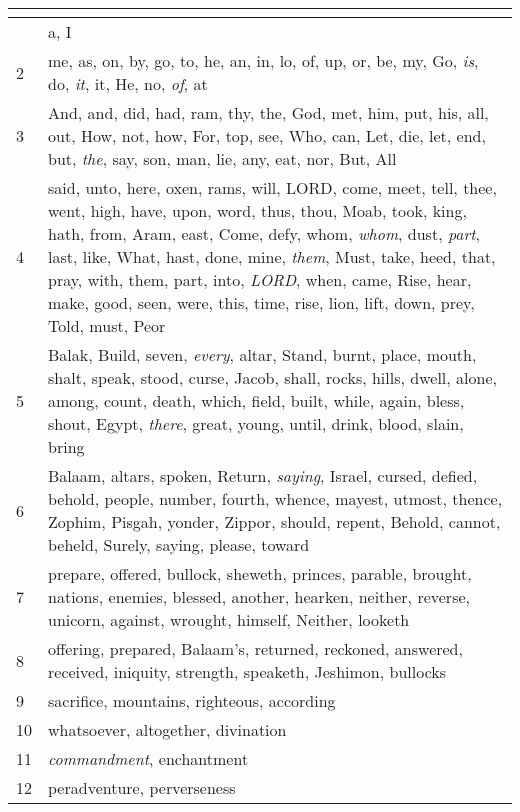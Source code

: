 \begin{center}
\begin{longtable}{l|p{3.75in}}
\hline \multicolumn{2}{c}{{ }} \\ \hline
\endfoot 
1 & a, I\\ \hline 
2 & me, as, on, by, go, to, he, an, in, lo, of, up, or, be, my, Go, \emph{is}, do, \emph{it}, it, He, no, \emph{of}, at\\ \hline 
3 & And, and, did, had, ram, thy, the, God, met, him, put, his, all, out, How, not, how, For, top, see, Who, can, Let, die, let, end, but, \emph{the}, say, son, man, lie, any, eat, nor, But, All\\ \hline 
4 & said, unto, here, oxen, rams, will, LORD, come, meet, tell, thee, went, high, have, upon, word, thus, thou, Moab, took, king, hath, from, Aram, east, Come, defy, whom, \emph{whom}, dust, \emph{part}, last, like, What, hast, done, mine, \emph{them}, Must, take, heed, that, pray, with, them, part, into, \emph{LORD}, when, came, Rise, hear, make, good, seen, were, this, time, rise, lion, lift, down, prey, Told, must, Peor\\ \hline 
5 & Balak, Build, seven, \emph{every}, altar, Stand, burnt, place, mouth, shalt, speak, stood, curse, Jacob, shall, rocks, hills, dwell, alone, among, count, death, which, field, built, while, again, bless, shout, Egypt, \emph{there}, great, young, until, drink, blood, slain, bring\\ \hline 
6 & Balaam, altars, spoken, Return, \emph{saying}, Israel, cursed, defied, behold, people, number, fourth, whence, mayest, utmost, thence, Zophim, Pisgah, yonder, Zippor, should, repent, Behold, cannot, beheld, Surely, saying, please, toward\\ \hline 
7 & prepare, offered, bullock, sheweth, princes, parable, brought, nations, enemies, blessed, another, hearken, neither, reverse, unicorn, against, wrought, himself, Neither, looketh\\ \hline 
8 & offering, prepared, Balaam's, returned, reckoned, answered, received, iniquity, strength, speaketh, Jeshimon, bullocks\\ \hline 
9 & sacrifice, mountains, righteous, according\\ \hline 
10 & whatsoever, altogether, divination\\ \hline 
11 & \emph{commandment}, enchantment\\ \hline 
12 & peradventure, perverseness\\ \hline 
\end{longtable}
\end{center}





